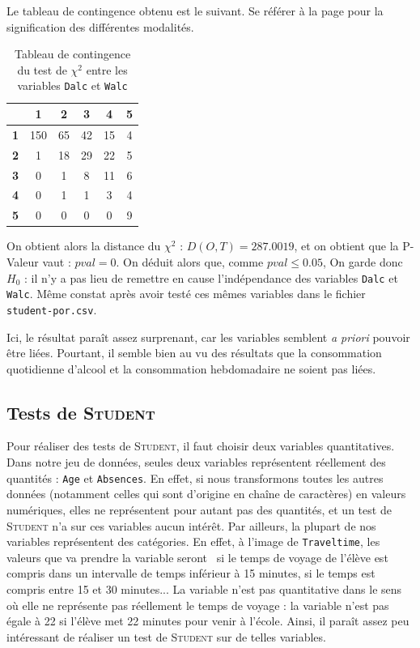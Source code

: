 \documentclass[11pt]{article}
\begin{document}
Le tableau de contingence obtenu est le suivant. Se référer à la page \pageref{rap3} pour la signification des différentes modalités.
\begin{table}[h] \centering \caption{Tableau de contingence du test de $\chi^2$ entre les variables \texttt{Dalc} et \texttt{Walc}}
\begin{tabular}{|c|c|c|c|c|c|}
  \hline
 	\backslashbox{\textbf{\emph{Dalc}}}{\textbf{\emph{Walc}}}& \textbf{1} &\textbf{2} & \textbf{3} & \textbf{4} & \textbf{5} \\
  \hline
          
            \textbf{1}  & 150   & 65  &  42  &  15 &    4\\\hline
           \textbf{2}& 1  &  18&    29   & 22 &    5\\\hline
    	      \textbf{3}&  0 &    1 &    8  &  11  &   6\\\hline
           \textbf{4} & 0  &   1  &   1  &   3   &  4\\\hline
          \textbf{5} & 0   &  0  &   0 &    0   &  9\\\hline
 \end{tabular}
\end{table}

On obtient alors la distance du $\chi^2$ : $D(O,T)=287.0019$, et on obtient que la P-Valeur vaut : $pval = 0$. On déduit alors que, comme $pval\leq 0.05$, On garde donc $H_0$ : il n'y a pas lieu de remettre en cause l'indépendance des variables \texttt{Dalc} et \texttt{Walc}. Même constat après avoir testé ces mêmes variables dans le fichier \texttt{student-por.csv}.

Ici, le résultat paraît assez surprenant, car les variables semblent \emph{a priori} pouvoir être liées. Pourtant, il semble bien au vu des résultats que la consommation quotidienne d'alcool et la consommation hebdomadaire ne soient pas liées.


\subsection{Tests de \textsc{Student}}
Pour réaliser des tests de \textsc{Student}, il faut choisir deux variables quantitatives. Dans notre jeu de données, seules deux variables représentent réellement des quantités : \texttt{Age} et \texttt{Absences}. En effet, si nous transformons toutes les autres données (notamment celles qui sont d'origine en chaîne de caractères) en valeurs numériques, elles ne représentent pour autant pas des quantités, et un test de \textsc{Student} n'a sur ces variables aucun intérêt. Par ailleurs, la plupart de nos variables représentent des catégories. En effet, à l'image de \texttt{Traveltime}, les valeurs que va prendre la variable seront  \fg\ si le temps de voyage de l'élève est compris dans un intervalle de temps inférieur à 15 minutes,  \fg si le temps est compris entre 15 et 30 minutes... La variable n'est pas quantitative dans le sens où elle ne représente pas réellement le temps de voyage : la variable n'est pas égale à 22 si l'élève met 22 minutes pour venir à l'école. Ainsi, il paraît assez peu intéressant de réaliser un test de \textsc{Student} sur de telles variables.
\end{document}
